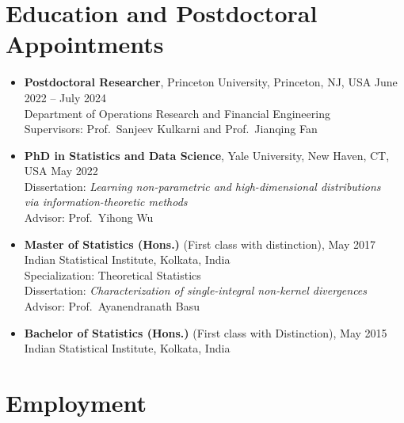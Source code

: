 \documentclass[letterpaper,oneside]{article}
\begin{document}
\section*{Education and Postdoctoral Appointments}

\begin{itemize}[leftmargin=0pt, label={}]
  \item \textbf{Postdoctoral Researcher}, Princeton University, Princeton, NJ, USA \hfill June 2022 -- July 2024\\
  Department of Operations Research and Financial Engineering\\
  Supervisors: Prof.\ Sanjeev Kulkarni and Prof.\ Jianqing Fan

  \item \textbf{PhD in Statistics and Data Science}, Yale University, New Haven, CT, USA \hfill May 2022\\
  Dissertation: \textit{Learning non-parametric and high-dimensional distributions\\ via information-theoretic methods}\\
  Advisor: Prof.\ Yihong Wu

  \item \textbf{Master of Statistics (Hons.)} (First class with distinction), \hfill May 2017\\  
  Indian Statistical Institute, Kolkata, India\\
  Specialization: Theoretical Statistics\\
  Dissertation: \textit{Characterization of single-integral non-kernel divergences}\\
  Advisor: Prof.\ Ayanendranath Basu

  \item \textbf{Bachelor of Statistics (Hons.)} (First class with Distinction), \hfill May 2015\\
  Indian Statistical Institute, Kolkata, India
\end{itemize}

\section*{Employment}
\end{document}
